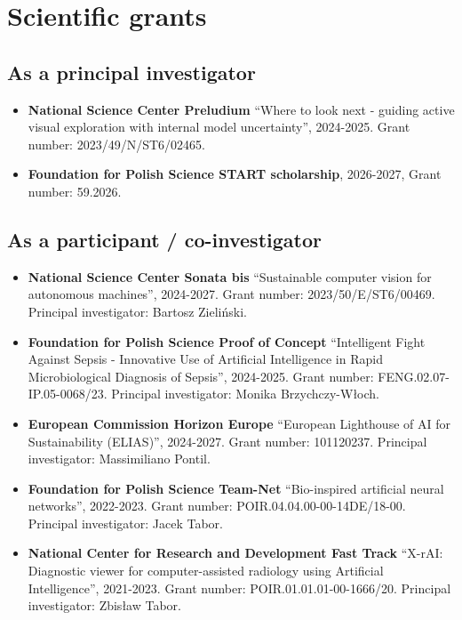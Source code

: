 \section{Scientific grants}
\subsection{As a principal investigator}
\begin{itemize}
    \item \textbf{National Science Center Preludium} ``Where to look next - guiding active visual exploration with
    internal model uncertainty'', 2024-2025. Grant number: 2023/49/N/ST6/02465.
    \item \textbf{Foundation for Polish Science START scholarship}, 2026-2027, Grant number: 59.2026.
\end{itemize}

\subsection{As a participant / co-investigator}
\begin{itemize}
    \item \textbf{National Science Center Sonata bis} ``Sustainable computer vision for autonomous machines'', 2024-2027. Grant number: 2023/50/E/ST6/00469. Principal investigator: Bartosz Zieliński.
    \item \textbf{Foundation for Polish Science Proof of Concept} ``Intelligent Fight Against Sepsis - Innovative Use of Artificial Intelligence in Rapid Microbiological Diagnosis of Sepsis'', 2024-2025. Grant number: FENG.02.07-IP.05-0068/23. Principal investigator: Monika Brzychczy-Włoch.
    \item \textbf{European Commission Horizon Europe} ``European Lighthouse of AI for Sustainability (ELIAS)'', 2024-2027. Grant number: 101120237. Principal investigator: Massimiliano Pontil.
    \item \textbf{Foundation for Polish Science Team-Net} ``Bio-inspired artificial neural networks'', 2022-2023. Grant number: POIR.04.04.00-00-14DE/18-00. Principal investigator: Jacek Tabor.
    \item \textbf{National Center for Research and Development Fast Track} ``X-rAI: Diagnostic viewer for computer-assisted radiology using Artificial Intelligence'', 2021-2023. Grant number: POIR.01.01.01-00-1666/20. Principal investigator: Zbisław Tabor.
\end{itemize}

